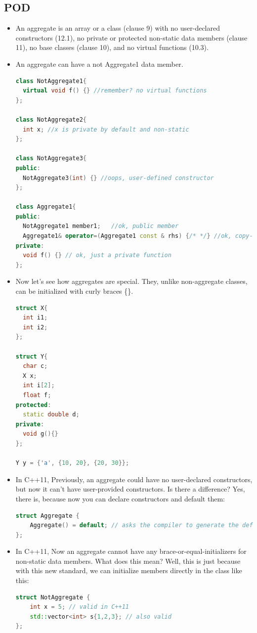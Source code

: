 \documentclass[a4paper,12pt,twoside]{book}
\begin{document}
\subsection{POD}
\begin{itemize}
\item An aggregate is an array or a class (clause 9) with no user-declared constructors (12.1), no private or protected non-static data members (clause 11), no base classes (clause 10), and no virtual functions (10.3).

\item  An aggregate can have a not Aggregate1 data member.
\begin{lstlisting}[frame=single, language=c++]
class NotAggregate1{
  virtual void f() {} //remember? no virtual functions
};

class NotAggregate2{
  int x; //x is private by default and non-static 
};

class NotAggregate3{
public:
  NotAggregate3(int) {} //oops, user-defined constructor
};

class Aggregate1{
public:
  NotAggregate1 member1;   //ok, public member
  Aggregate1& operator=(Aggregate1 const & rhs) {/* */} //ok, copy-assignment  
private:
  void f() {} // ok, just a private function
};
\end{lstlisting}

\item Now let's see how aggregates are special. They, unlike non-aggregate classes, can be initialized with curly braces \{\}. 
\begin{lstlisting}[frame=single, language=c++]
struct X{
  int i1;
  int i2;
};

struct Y{
  char c;
  X x;
  int i[2];
  float f; 
protected:
  static double d;
private:
  void g(){}      
}; 

Y y = {'a', {10, 20}, {20, 30}};
\end{lstlisting}

\item In C++11, Previously, an aggregate could have no user-declared constructors, but now it can't have user-provided constructors. Is there a difference? Yes, there is, because now you can declare constructors and default them:
\begin{lstlisting}[frame=single, language=c++]
struct Aggregate {
    Aggregate() = default; // asks the compiler to generate the default implementation
};
\end{lstlisting}

\item In C++11, Now an aggregate cannot have any brace-or-equal-initializers for non-static data members. What does this mean? Well, this is just because with this new standard, we can initialize members directly in the class like this:
\begin{lstlisting}[frame=single, language=c++]
struct NotAggregate {
    int x = 5; // valid in C++11
    std::vector<int> s{1,2,3}; // also valid
};
\end{lstlisting}



\end{itemize}
\end{document}

